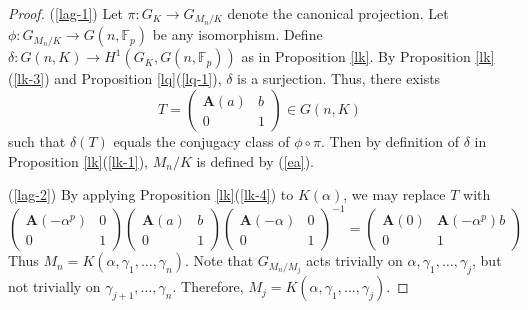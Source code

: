 \documentclass[sn-mathphys-num]{sn-jnl}
\numberwithin{equation}{section}
\theoremstyle{plain}
\theoremstyle{definition}
\begin{document}
  \begin{proof}
(\ref{lag-1}) Let $\pi:G_K\to G_{M_n/K}$ denote the canonical projection. Let $\phi:G_{M_n/K}\to G(n,\mathbb{F}_p)$ be any isomorphism. Define $\delta:G(n,K)\to H^1(G_K,G(n,\mathbb{F}_p))$ as in Proposition \ref{lk}. By Proposition \ref{lk}(\ref{lk-3}) and Proposition \ref{lq}(\ref{lq-1}), $\delta$ is a surjection. Thus, there exists
  \begin{equation}
T=\begin{pmatrix}
  \mathbf{A}(a)&b\\
  0&1
\end{pmatrix}
\in G(n,K)
\end{equation}
such that $\delta(T)$ equals the conjugacy class of $\phi\circ\pi$. Then by definition of $\delta$ in Proposition \ref{lk}(\ref{lk-1}), $M_n/K$ is defined by (\ref{ea}).

(\ref{lag-2}) By applying Proposition \ref{lk}(\ref{lk-4}) to $K(\alpha)$, we may replace $T$ with
  \begin{equation}
\begin{pmatrix}
  \mathbf{A}(-\alpha^p)&0\\
  0&1
\end{pmatrix}
\begin{pmatrix}
  \mathbf{A}(a)&b\\
  0&1
\end{pmatrix}
\begin{pmatrix}
  \mathbf{A}(-\alpha)&0\\
  0&1
\end{pmatrix}^{-1}
=\begin{pmatrix}
  \mathbf{A}(0)&\mathbf{A}(-\alpha^p)b\\
  0&1
  \end{pmatrix}
\end{equation}
Thus $M_n=K(\alpha,\gamma_1,\ldots,\gamma_n)$. Note that $G_{M_n/M_j}$ acts trivially on $\alpha,\gamma_1,\ldots,\gamma_j$, but not trivially on $\gamma_{j+1},\ldots,\gamma_n$. Therefore, $M_j=K(\alpha,\gamma_1,\ldots,\gamma_j)$.
  \end{proof}

  
\end{document}
